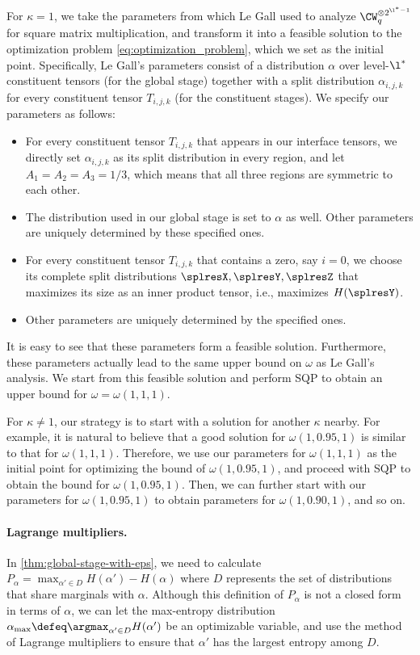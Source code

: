 For $\kappa = 1$, we take the parameters from \cite{LeGall32power} which Le Gall used to analyze $\CW_q^{\otimes 2^{\l^* - 1}}$ for square matrix multiplication, and transform it into a feasible solution to the optimization problem \eqref{eq:optimization_problem}, which we set as the initial point. Specifically, Le Gall's parameters consist of a distribution $\alpha$ over level-$\l^*$ constituent tensors (for the global stage) together with a split distribution $\alpha_{i,j,k}$ for every constituent tensor $T_{i,j,k}$ (for the constituent stages). We specify our parameters as follows:
\begin{itemize}
\item For every constituent tensor $T_{i,j,k}$ that appears in our interface tensors, we directly set $\alpha_{i,j,k}$ as its split distribution in every region, and let $A_1 = A_2 = A_3 = 1/3$, which means that all three regions are symmetric to each other.
\item The distribution used in our global stage is set to $\alpha$ as well. Other parameters are uniquely determined by these specified ones.
\item For every constituent tensor $T_{i,j,k}$ that contains a zero, say $i = 0$, we choose its complete split distributions $\splresX, \splresY, \splresZ$ that maximizes its size as an inner product tensor, i.e., maximizes $H(\splresY)$.
\item Other parameters are uniquely determined by the specified ones.
\end{itemize}
It is easy to see that these parameters form a feasible solution. Furthermore, these parameters actually lead to the same upper bound on $\omega$ as Le Gall's analysis. We start from this feasible solution and perform SQP to obtain an upper bound for $\omega = \omega(1, 1, 1)$.

For $\kappa \ne 1$, our strategy is to start with a solution for another $\kappa$ nearby. For example, it is natural to believe that a good solution for $\omega(1, 0.95, 1)$ is similar to that for $\omega(1, 1, 1)$. Therefore, we use our parameters for $\omega(1, 1, 1)$ as the initial point for optimizing the bound of $\omega(1, 0.95, 1)$, and proceed with SQP to obtain the bound for $\omega(1, 0.95, 1)$. Then, we can further start with our parameters for $\omega(1, 0.95, 1)$ to obtain parameters for $\omega(1, 0.90, 1)$, and so on.

\paragraph{Lagrange multipliers.} In \cref{thm:global-stage-with-eps}, we need to calculate $P_\alpha = \max_{\alpha' \in D} H(\alpha') - H(\alpha)$ where $D$ represents the set of distributions that share marginals with $\alpha$. Although this definition of $P_\alpha$ is not a closed form in terms of $\alpha$, we can let the max-entropy distribution $\alpha_{\max} \defeq \argmax_{\alpha' \in D} H(\alpha')$ be an optimizable variable, and use the method of Lagrange multipliers to ensure that $\alpha'$ has the largest entropy among $D$.

